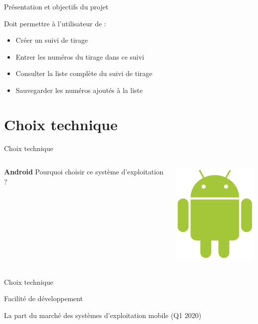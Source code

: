 \documentclass{beamer}
\begin{document}
\begin{frame}{Présentation et objectifs du projet}

Doit permettre à l'utilisateur de :
\vspace{2em}
\begin{itemize}[label=\textbullet, font=\large \color{blue}]
    \item Créer un suivi de tirage
    \item Entrer les numéros du tirage dans ce suivi
    \item Consulter la liste complète du suivi de tirage
    \item Sauvegarder les numéros ajoutés à la liste
\end{itemize}
\end{frame}

\section{Choix technique}

\begin{frame}{Choix technique}
    \begin{columns}[T]
     \begin{column}[c]{5cm}
        \textbf{\LARGE{Android}}
        \vspace{3em}
        \newline Pourquoi choisir ce système d'exploitation ?
     \end{column}
     \begin{column}[c]{5cm}
          \begin{center}\includegraphics[height=5cm]{Images/872px-Android_robot.svg.png} \end{center}
     \end{column}
     \end{columns}
    
\end{frame}

\begin{frame}{Choix technique}
    \begin{center}
    \end{center}
    \begin{center}
        Facilité de développement
    \end{center}
    \vspace{3em}
    \begin{center}
    \end{center}
    \begin{center}
        La part du marché des systèmes d'exploitation mobile (Q1 2020)
    \end{center}
\end{frame}
\end{document}
